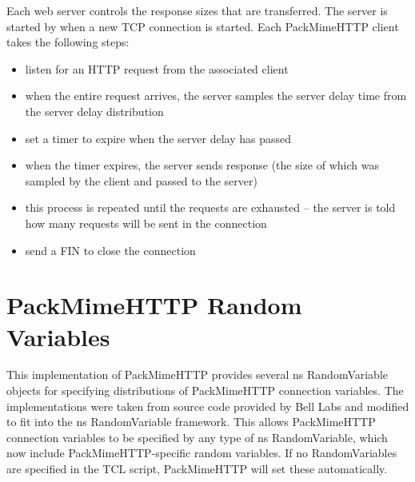Each web server controls the response sizes that are transferred. The
server is started by when a new TCP connection is started. Each
PackMimeHTTP client takes the following steps: 
\begin{itemize}
\item{listen for an HTTP request from the associated client}
\item{when the entire request arrives, the server samples the server
delay time from the server delay distribution} 
\item{set a timer to expire when the server delay has passed}
\item{when the timer expires, the server sends response (the size of
  which was sampled by the client and passed to the server)}
\item{this process is repeated until the requests are exhausted -- the
server is told how many requests will be sent in the connection} 
\item{send a FIN to close the connection}
\end{itemize}

\section{PackMimeHTTP Random Variables}

This implementation of PackMimeHTTP provides several ns RandomVariable
objects for specifying distributions of PackMimeHTTP connection
variables. The implementations were taken from source code provided by
Bell Labs and modified to fit into the ns RandomVariable
framework. This allows PackMimeHTTP connection variables to be
specified by any type of ns RandomVariable, which now include
PackMimeHTTP-specific random variables. If no RandomVariables are
specified in the TCL script, PackMimeHTTP will set these
automatically.  

